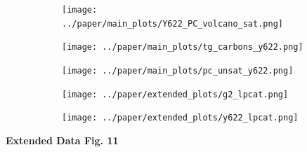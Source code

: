 \begin{figure}[H]
    \begin{subfigure}[t]{.3\textwidth}
        \caption{}
        \texttt{[image: ../paper/main\_plots/Y622\_PC\_volcano\_sat.png]}        
    \end{subfigure} 
    \begin{subfigure}[t]{.3\textwidth}
        \caption{}
        \texttt{[image: ../paper/main\_plots/tg\_carbons\_y622.png]}        
    \end{subfigure} 
    \begin{subfigure}[t]{.3\textwidth}
        \caption{}
        \texttt{[image: ../paper/main\_plots/pc\_unsat\_y622.png]}        
    \end{subfigure} 
    \begin{subfigure}[t]{.2\textwidth}
        \caption{}
        \texttt{[image: ../paper/extended\_plots/g2\_lpcat.png]}        
    \end{subfigure} 
    \begin{subfigure}[t]{.2\textwidth}
        \caption{}
        \texttt{[image: ../paper/extended\_plots/y622\_lpcat.png]}        
    \end{subfigure} 
\end{figure}
\textbf{Extended Data Fig. 11}